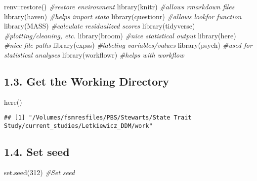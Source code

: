 \documentclass[
]{article}
\newenvironment{Shaded}{\begin{snugshade}}{\end{snugshade}}
\newcommand{\CommentTok}[1]{\textcolor[rgb]{0.56,0.35,0.01}{\textit{#1}}}
\newcommand{\DecValTok}[1]{\textcolor[rgb]{0.00,0.00,0.81}{#1}}
\newcommand{\FunctionTok}[1]{\textcolor[rgb]{0.00,0.00,0.00}{#1}}
\newcommand{\NormalTok}[1]{#1}
\newcommand{\SpecialCharTok}[1]{\textcolor[rgb]{0.00,0.00,0.00}{#1}}
\begin{document}
\begin{Shaded}
\begin{Highlighting}[]
\NormalTok{  renv}\SpecialCharTok{::}\FunctionTok{restore}\NormalTok{()     }\CommentTok{\#restore environment}
  \FunctionTok{library}\NormalTok{(knitr)      }\CommentTok{\#allows rmarkdown files}
  \FunctionTok{library}\NormalTok{(haven)      }\CommentTok{\#helps import stata}
  \FunctionTok{library}\NormalTok{(questionr)  }\CommentTok{\#allows lookfor function}
  \FunctionTok{library}\NormalTok{(MASS)       }\CommentTok{\#calculate residualized scores}
  \FunctionTok{library}\NormalTok{(tidyverse)  }\CommentTok{\#plotting/cleaning, etc.}
  \FunctionTok{library}\NormalTok{(broom)      }\CommentTok{\#nice statistical output}
  \FunctionTok{library}\NormalTok{(here)       }\CommentTok{\#nice file paths}
  \FunctionTok{library}\NormalTok{(expss)      }\CommentTok{\#labeling variables/values}
  \FunctionTok{library}\NormalTok{(psych)      }\CommentTok{\#used for statistical analyses}
  \FunctionTok{library}\NormalTok{(workflowr)  }\CommentTok{\#helps with workflow}
\end{Highlighting}
\end{Shaded}

\hypertarget{get-the-working-directory}{%
\subsection{1.3. Get the Working
Directory}\label{get-the-working-directory}}

\begin{Shaded}
\begin{Highlighting}[]
  \FunctionTok{here}\NormalTok{()}
\end{Highlighting}
\end{Shaded}

\begin{verbatim}
## [1] "/Volumes/fsmresfiles/PBS/Stewarts/State Trait Study/current_studies/Letkiewicz_DDM/work"
\end{verbatim}

\hypertarget{set-seed}{%
\subsection{1.4. Set seed}\label{set-seed}}

\begin{Shaded}
\begin{Highlighting}[]
     \FunctionTok{set.seed}\NormalTok{(}\DecValTok{312}\NormalTok{)    }\CommentTok{\#Set seed}
\end{Highlighting}
\end{Shaded}
\end{document}
